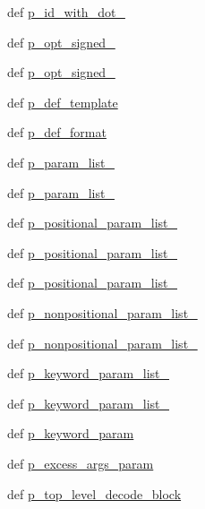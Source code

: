 \begin{DoxyCompactItemize}
def \hyperlink{classisa__parser_1_1ISAParser_a1e74f312da11d484e5f38ac637e58e98}{p\_\-id\_\-with\_\-dot\_}
\item 
def \hyperlink{classisa__parser_1_1ISAParser_abb51e6d2be69f1f88b287eef8b74c24a}{p\_\-opt\_\-signed\_}
\item 
def \hyperlink{classisa__parser_1_1ISAParser_a1139be203adb387357147952776b6dde}{p\_\-opt\_\-signed\_}
\item 
def \hyperlink{classisa__parser_1_1ISAParser_acfab746fcb8e4b603b036cec011f6f5c}{p\_\-def\_\-template}
\item 
def \hyperlink{classisa__parser_1_1ISAParser_abd4fecf0c2ed51e6ee71e33ff25dacf9}{p\_\-def\_\-format}
\item 
def \hyperlink{classisa__parser_1_1ISAParser_ada36c98a3c763e936519a176c2cafe8f}{p\_\-param\_\-list\_}
\item 
def \hyperlink{classisa__parser_1_1ISAParser_a149ac42b4c3256238fa136cbd735db9e}{p\_\-param\_\-list\_}
\item 
def \hyperlink{classisa__parser_1_1ISAParser_a8edf3fe36a9a76b8413c6ad5e1cec1b8}{p\_\-positional\_\-param\_\-list\_}
\item 
def \hyperlink{classisa__parser_1_1ISAParser_a45440a229a3e7f21099050287b61b387}{p\_\-positional\_\-param\_\-list\_}
\item 
def \hyperlink{classisa__parser_1_1ISAParser_a88e0b07de00cd8856f931b5d2e153ed9}{p\_\-positional\_\-param\_\-list\_}
\item 
def \hyperlink{classisa__parser_1_1ISAParser_a3e0f5ac33bb0d8d44ef032510f44565d}{p\_\-nonpositional\_\-param\_\-list\_}
\item 
def \hyperlink{classisa__parser_1_1ISAParser_aded99c866ceb14d316e5a5bb6fab0338}{p\_\-nonpositional\_\-param\_\-list\_}
\item 
def \hyperlink{classisa__parser_1_1ISAParser_a5e897854531c70c03e3d4a2b5b274df7}{p\_\-keyword\_\-param\_\-list\_}
\item 
def \hyperlink{classisa__parser_1_1ISAParser_af650b9c46d006e5ad517c7391c0e197e}{p\_\-keyword\_\-param\_\-list\_}
\item 
def \hyperlink{classisa__parser_1_1ISAParser_a6fa985fad0d498755497e9ce8ebcaa45}{p\_\-keyword\_\-param}
\item 
def \hyperlink{classisa__parser_1_1ISAParser_a16601844da02de1278037959597f5278}{p\_\-excess\_\-args\_\-param}
\item 
def \hyperlink{classisa__parser_1_1ISAParser_aa4a08b0e5dc67e986df97892c447fae0}{p\_\-top\_\-level\_\-decode\_\-block}

\end{DoxyCompactItemize}
